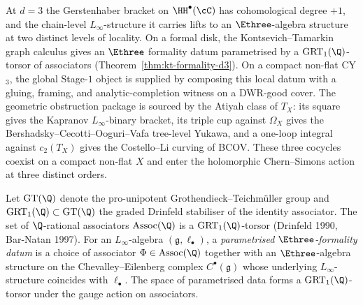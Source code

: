 At $d = 3$ the Gerstenhaber bracket on $\HH^\bullet(\cC)$ has
cohomological degree $+1$, and the chain-level $L_\infty$-structure it
carries lifts to an $\Ethree$-algebra structure at two distinct
levels of locality. On a formal disk, the Kontsevich--Tamarkin graph
calculus gives an $\Ethree$ formality datum parametrised by a
$\mathrm{GRT}_1(\Q)$-torsor of associators
(Theorem~\ref{thm:kt-formality-d3}). On a compact non-flat CY$_3$,
the global Stage-$1$ object is supplied by composing this local datum
with a gluing, framing, and analytic-completion witness on a DWR-good
cover. The geometric obstruction package is sourced by the
Atiyah class of $T_X$: its square gives the Kapranov
$L_\infty$-binary bracket, its triple cup against $\Omega_X$ gives the
Bershadsky--Cecotti--Ooguri--Vafa tree-level Yukawa, and a one-loop
integral against $c_2(T_X)$ gives the Costello--Li curving of BCOV.
These three cocycles coexist on a compact non-flat $X$ and enter the
holomorphic Chern--Simons action at three distinct orders.

\begin{definition}
\label{def:grt-torsor-associators}
Let $\mathrm{GT}(\Q)$ denote the pro-unipotent Grothendieck--Teichm\"uller group and $\mathrm{GRT}_1(\Q) \subset \mathrm{GT}(\Q)$ the graded Drinfeld stabiliser of the identity associator. The set of $\Q$-rational associators $\mathrm{Assoc}(\Q)$ is a $\mathrm{GRT}_1(\Q)$-torsor (Drinfeld 1990, Bar-Natan 1997). For an $L_\infty$-algebra $(\mathfrak g, \ell_\bullet)$, a \emph{parametrised $\Ethree$-formality datum} is a choice of associator $\Phi \in \mathrm{Assoc}(\Q)$ together with an $\Ethree$-algebra structure on the Chevalley--Eilenberg complex $C^\bullet(\mathfrak g)$ whose underlying $L_\infty$-structure coincides with $\ell_\bullet$. The space of parametrised data forms a $\mathrm{GRT}_1(\Q)$-torsor under the gauge action on associators.
\end{definition}

